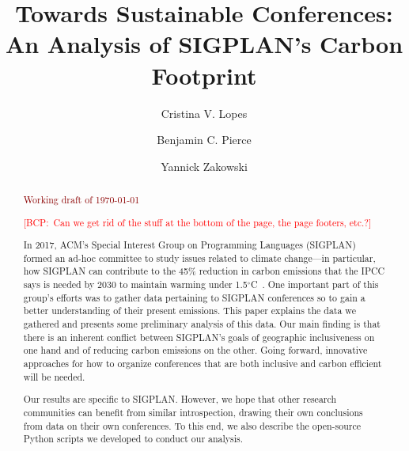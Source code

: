 \documentclass[screen,acmlarge]{acmart}
\newif\ifcomments\commentstrue   %
\newcommand{\bcp}[1]{\textcolor{red}{{[BCP:~#1]}}}
\newcommand{\bcp}[1]{}
\newif\ifopinions\opinionsfalse   %
\begin{document}
\title{Towards Sustainable Conferences:
An Analysis of SIGPLAN's Carbon Footprint}

\author{Cristina V. Lopes}

\author{Benjamin C. Pierce}

\author{Yannick Zakowski}

\begin{abstract}
\bigskip
\begin{center}
{\ifcomments\huge\textcolor{darkred}{Working draft of \today}\fi}
\end{center}
\bigskip
\bcp{Can we get rid of the stuff at the bottom of the page, the page
  footers, etc.?}
\bigskip

\noindent In 2017, ACM's Special Interest Group on Programming Languages (SIGPLAN)
formed an ad-hoc committee to study issues related to climate change---in
particular, how SIGPLAN can contribute to the 45\% reduction in carbon
emissions that the IPCC says is needed by 2030 to maintain warming under
1.5$^{\circ}$C~\cite{IPCCReport}.
One important part of this group's efforts was
to gather data pertaining to SIGPLAN conferences so to gain a better
understanding of their present emissions. This paper explains the data we
gathered and presents some preliminary analysis of this data. Our main
finding is that there is an inherent conflict between SIGPLAN's goals of
geographic inclusiveness on one hand and of reducing carbon emissions on the
other. Going forward, innovative approaches for how to organize conferences
that are both inclusive and carbon efficient will be needed.

Our results are specific to SIGPLAN.  However, we hope that other research
communities can benefit from similar introspection, drawing their own
conclusions from data on their own conferences. To this end, we also
describe the open-source Python scripts we developed to conduct our
analysis.

\end{abstract}


\maketitle






\ifopinions\fi




\end{document}

